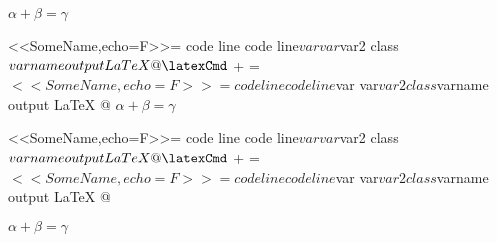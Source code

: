 % 



\latexCmd
$ \alpha + \beta = \gamma $	

<<SomeName,echo=F>>=
code line
code line$var
var$var2
class$varname
output LaTeX
@  %

\latexCmd
$ \alpha + \beta = \gamma $	

<<SomeName,echo=F>>=
code line
code line$var
var$var2
class$varname
output LaTeX
 @  
\latexCmd
$ \alpha + \beta = \gamma $	

<<SomeName,echo=F>>=
code line
code line$var
var$var2
class$varname
output LaTeX
@  %

\latexCmd
$ \alpha + \beta = \gamma $	

<<SomeName,echo=F>>=
code line
code line$var
var$var2
class$varname
output LaTeX
 @  %

\latexCmd
$ \alpha + \beta = \gamma $	




